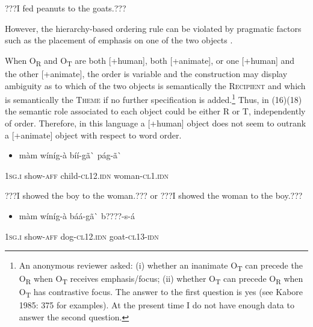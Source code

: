 \documentclass[output=paper]{langsci/langscibook}
\begin{document}
{{\begin{styleTranslation}
???I fed peanuts to the goats.???
\end{styleTranslation}

However, the hierarchy-based ordering rule can be violated by pragmatic factors such as the placement of emphasis on one of the two objects \citep[375]{Kabore1985}.

When O\textsubscript{R} and O\textsubscript{T} are both [+human], both [+animate], or one [+human] and the other [+animate],  the order is variable and the construction may display ambiguity as to which of the two objects is semantically the \textsc{Recipient} and which is semantically the \textsc{Theme} if no further specification is added.\footnote{ An anonymous reviewer asked: (i) whether an inanimate O\textsubscript{T} can precede the O\textsubscript{R} when O\textsubscript{T} receives emphasis/focus; (ii) whether O\textsubscript{T }can precede O\textsubscript{R} when O\textsubscript{T} has contrastive focus. The answer to the first question is yes (see Kabore 1985: 375 for examples). At the present time I do not have enough data to answer the second question.} Thus, in (16)(18) the semantic role associated to each object could be either R or T, independently of order. Therefore, in this language a [+human] object does not seem to outrank a [+animate] object with respect to word order.

\begin{itemize}
\item \begin{styleNumberedEX}
\label{bkm:Ref424143119}m\`{a}m    w\'{i}n\'{i}g-\`{a}    b\'{i}\'{i}-g\~{a}\`{ }      p\'{a}g-\~{a}\`{ }
\end{styleNumberedEX}\end{itemize}
\begin{styleGloss}
\textsc{1sg.i  }  show-\textsc{aff}    child-\textsc{cl12.idn}  woman-\textsc{cl1.idn}
\end{styleGloss}

\begin{styleTranslation}
???I showed the boy to the woman.??? or ???I showed the woman to the boy.???
\end{styleTranslation}

\begin{itemize}
\item \begin{styleNumberedEX}
m\`{a}m    w\'{i}n\'{i}g-\`{a}    b\'{a}\'{a}-g\~{a}\`{ }    b????-s-\'{a}
\end{styleNumberedEX}\end{itemize}
\begin{styleGloss}
\textsc{1sg.i  }  show-\textsc{aff}    dog-\textsc{cl12.idn}  goat-\textsc{cl13-idn}
\end{styleGloss}

}}
\end{document}
